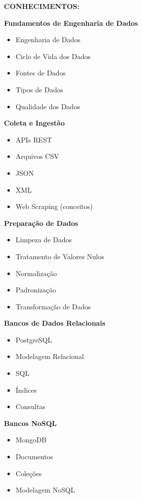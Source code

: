\textbf{CONHECIMENTOS:}

\textbf{Fundamentos de Engenharia de Dados}

\begin{itemize}
\item Engenharia de Dados
\item Ciclo de Vida dos Dados
\item Fontes de Dados
\item Tipos de Dados
\item Qualidade dos Dados
\end{itemize}

\textbf{Coleta e Ingestão}

\begin{itemize}
\item APIs REST
\item Arquivos CSV
\item JSON
\item XML
\item Web Scraping (conceitos)
\end{itemize}

\textbf{Preparação de Dados}

\begin{itemize}
\item Limpeza de Dados
\item Tratamento de Valores Nulos
\item Normalização
\item Padronização
\item Transformação de Dados
\end{itemize}

\textbf{Bancos de Dados Relacionais}

\begin{itemize}
\item PostgreSQL
\item Modelagem Relacional
\item SQL
\item Índices
\item Consultas
\end{itemize}

\textbf{Bancos NoSQL}

\begin{itemize}
\item MongoDB
\item Documentos
\item Coleções
\item Modelagem NoSQL
\end{itemize}

